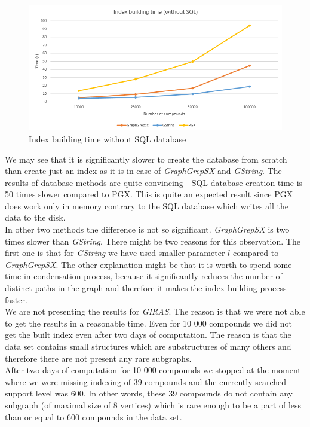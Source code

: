 \begin{figure}[h]
	\centering
	\includegraphics[width=1\textwidth]{../img/indexBuildingTimeNoSQL.png}
	\caption{Index building time without SQL database}
	\label{fig:indextimenosql}
\end{figure}

We may see that it is significantly slower to create the database from scratch than create just an index as it is in case of \textit{GraphGrepSX} and \textit{GString}. The results of database methods are quite convincing - SQL database creation time is 50 times slower compared to PGX. This is quite an expected result since PGX does work only in memory contrary to the SQL database which writes all the data to the disk.\\

In other two methods the difference is not so significant. \textit{GraphGrepSX} is two times slower than \textit{GString}. There might be two reasons for this observation. The first one is that for \textit{GString} we have used smaller parameter $l$ compared to \textit{GraphGrepSX}. The other explanation might be that it is worth to spend some time in condensation process, because it significantly reduces the number of distinct paths in the graph and therefore it makes the index building process faster.\\

We are not presenting the results for \textit{GIRAS}. The reason is that we were not able to get the results in a reasonable time. Even for 10 000 compounds we did not get the built index even after two days of computation. The reason is that the data set contains small structures which are substructures of many others and therefore there are not present any rare subgraphs.\\

After two days of computation for 10 000 compounds we stopped at the moment where we were missing indexing of 39 compounds and the currently searched support level was 600. In other words, these 39 compounds do not contain any subgraph (of maximal size of 8 vertices) which is rare enough to be a part of less than or equal to 600 compounds in the data set.\\


